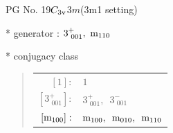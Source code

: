 \documentclass[fleqn,8pt]{jsarticle}
\begin{document}
\setcounter{MaxMatrixCols}{32}

\renewcommand{\tablename}{Table~}
\renewcommand{\figurename}{Figure~}
\begin{center}
\LARGE
PG No. 19\quad$C_{\rm 3v}$\quad$3m$\quad(3m1 setting)\quad[ trigonal ]
\end{center}

* generator : $3^{+}_{\,\,001},\,\,{\rm m}_{110}$

* conjugacy class
\begin{quote}
\begin{tabular}{rl}
$ [1]: $ & $ 1 $ \\
$ [3^{+}_{\,\,001}]: $ & $ 3^{+}_{\,\,001},\,\,\,3^{-}_{\,\,001} $ \\
$ [{\rm m}_{100}]: $ & $ {\rm m}_{100},\,\,\,{\rm m}_{010},\,\,\,{\rm m}_{110} $
\end{tabular}
\end{quote}
\end{document}
